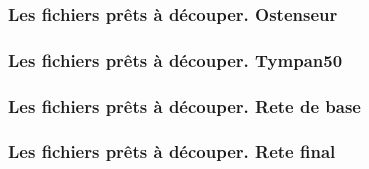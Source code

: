 \documentclass{beamer}
\begin{document}
\begin{frame}\frametitle{Les fichiers prêts à découper.  Ostenseur}
\begin{center}
\end{center}
   \end{frame}
   
\begin{frame}\frametitle{Les fichiers prêts à découper.  Tympan50}
\begin{center}
\end{center}
   \end{frame}
   

\begin{frame}\frametitle{Les fichiers prêts à découper.  Rete de base}
\begin{center}
\end{center}
   \end{frame}
   
\begin{frame}\frametitle{Les fichiers prêts à découper.  Rete final}
\begin{center}
\end{center}
   \end{frame}
   
\begin{frame}\frametitle{}

   \end{frame}
   

\begin{frame}\frametitle{}

   \end{frame}
   
\begin{frame}\frametitle{}

   \end{frame}
   
\begin{frame}\frametitle{}

   \end{frame}
   

\begin{frame}\frametitle{}

   \end{frame}
   
\begin{frame}\frametitle{}

   \end{frame}
   
\begin{frame}\frametitle{}

   \end{frame}
   


   
   
\end{document}
